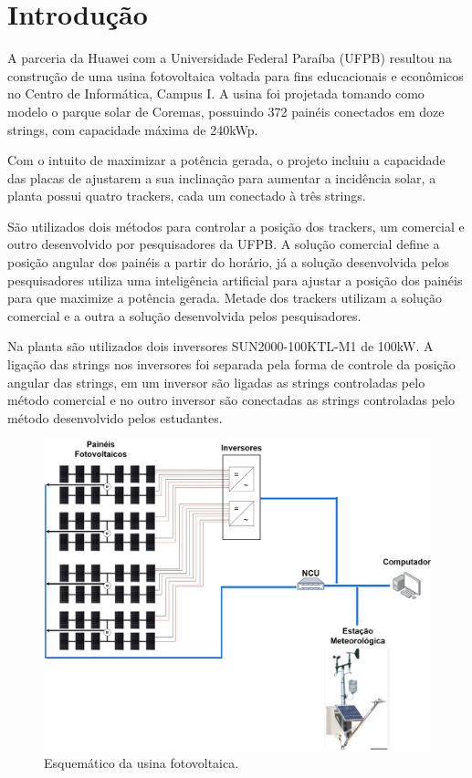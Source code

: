 \documentclass[a4paper,12pt]{article}
\begin{document}
\newpage

\clearpage
\listoftables
\clearpage
\tableofcontents
\newpage
{}
\pagebreak

\section{Introdução}


A parceria da Huawei com a Universidade Federal Paraíba (UFPB) resultou na construção de uma usina fotovoltaica voltada para fins educacionais e econômicos no Centro de Informática, Campus I. A usina foi projetada tomando como modelo o parque solar de Coremas, possuindo 372 painéis conectados em doze strings, com capacidade máxima de 240kWp.

Com o intuito de maximizar a potência gerada, o projeto incluiu a capacidade das placas de ajustarem a sua inclinação para aumentar a incidência solar, a planta possui quatro \gls{tracker}s, cada um conectado à três strings.

São utilizados dois métodos para controlar a posição dos \gls{tracker}s, um comercial e outro desenvolvido por pesquisadores da UFPB. A solução comercial define a posição angular dos painéis a partir do horário, já a solução desenvolvida pelos pesquisadores utiliza uma inteligência artificial para ajustar a posição dos painéis para que maximize a potência gerada. Metade dos \gls{tracker}s utilizam a solução comercial e a outra a solução desenvolvida pelos pesquisadores.

Na planta são utilizados dois inversores SUN2000-100KTL-M1 de 100kW.  A ligação das strings nos inversores foi separada pela forma de controle da posição angular das strings, em um inversor são ligadas as strings controladas pelo método comercial e no outro inversor são conectadas as strings controladas pelo método desenvolvido pelos estudantes.
\begin{figure} [!h]
    \centering
    \includegraphics[width=15cm]{Imagem/Arquitetura_usina.jpg}
    \caption{Esquemático da usina fotovoltaica.}
    \label{fig: arquitetura_usina}
\end{figure}
\end{document}
